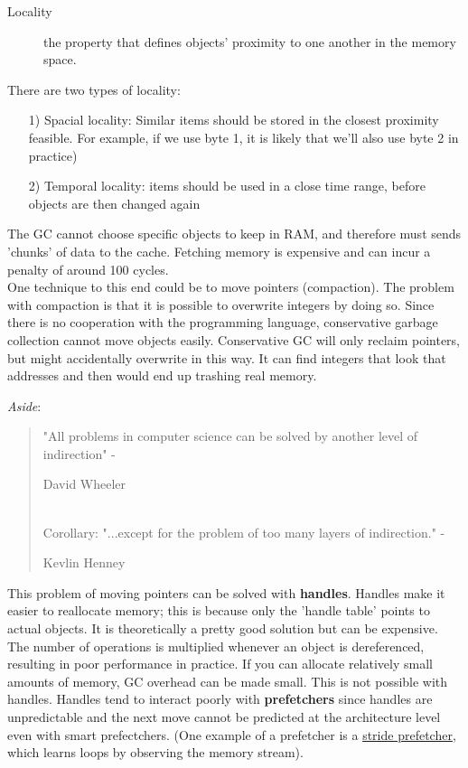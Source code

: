 \documentclass[twoside]{article}
\begin{document}
\begin{description}
\item[Locality] the property that defines objects' proximity to one another in the memory space. 
\end{description}
There are two types of locality:
\begin{itemize}
\item[1)] Spacial locality: Similar items should be stored in the closest proximity feasible. For example, if we use byte 1, it is likely that we'll also use byte 2 in practice)
\item[2)] Temporal locality: items should be used in a close time range, before objects are then changed again
\end{itemize}
The GC cannot choose specific objects to keep in RAM, and therefore must sends 'chunks' of data to the cache. Fetching memory is expensive and can incur a penalty of around 100 cycles.\\
One technique to this end could be to move pointers (compaction). The problem with compaction is that it is possible to overwrite integers by doing so. Since there is no cooperation with the programming language, conservative garbage collection cannot move objects easily. Conservative GC will only reclaim pointers, but might accidentally overwrite in this way. It can find integers that look that addresses and then would end up trashing real memory.

\emph{Aside}: \begin{quotation}"All problems in computer science can be solved by another level of indirection" -\begin{small}David Wheeler\end{small}\\
Corollary: "...except for the problem of too many layers of indirection." -\begin{small}Kevlin Henney\end{small}
\end{quotation}

This problem of moving pointers can be solved with \textbf{handles}. Handles make it easier to reallocate memory; this is because only the 'handle table' points to actual objects. It is theoretically a pretty good solution but can be expensive.  The number of operations is multiplied whenever an object is dereferenced, resulting in poor performance in practice. If you can allocate relatively small amounts of memory, GC overhead can be made small. This is not possible with handles. Handles tend to interact poorly with \textbf{prefetchers} since handles are unpredictable and the next move cannot be predicted at the architecture level even with smart prefectchers. (One example of a prefetcher is a \underline{stride prefetcher}, which learns loops by observing the memory stream).
\end{document}

